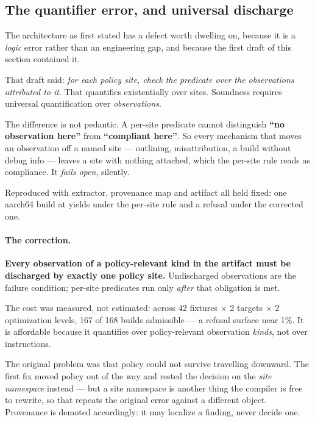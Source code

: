 \subsection{The quantifier error, and universal discharge}
\label{sec:quantifier}

The architecture as first stated has a defect worth dwelling on, because it is a
\emph{logic} error rather than an engineering gap, and because the first draft of
this section contained it.

That draft said: \emph{for each policy site, check the predicate over the
observations attributed to it}. That quantifies existentially over sites.
Soundness requires universal quantification over \emph{observations}.

The difference is not pedantic. A per-site predicate cannot distinguish
\textbf{``no observation here''} from \textbf{``compliant here''}. So every
mechanism that moves an observation off a named site --- outlining,
misattribution, a build without debug info --- leaves a site with nothing
attached, which the per-site rule reads as compliance. It \emph{fails open},
silently.

Reproduced with extractor, provenance map and artifact all held fixed: one
aarch64 build at  yields \Verified{} under the per-site rule and a
refusal under the corrected one.

\paragraph{The correction.} \textbf{Every observation of a policy-relevant kind
in the artifact must be discharged by exactly one policy site.} Undischarged
observations are the failure condition; per-site predicates run only \emph{after}
that obligation is met.

The cost was measured, not estimated: across 42 fixtures $\times$ 2 targets
$\times$ 2 optimization levels, 167 of 168 builds admissible --- a refusal
surface near 1\%. It is affordable because it quantifies over policy-relevant
observation \emph{kinds}, not over instructions.

\begin{remark}
The original problem was that policy could not survive travelling downward. The
first fix moved policy out of the way and rested the decision on the \emph{site
namespace} instead --- but a site namespace is another thing the compiler is free
to rewrite, so that repeats the original error against a different object.
Provenance is demoted accordingly: it may localize a finding, never decide one.
\end{remark}

